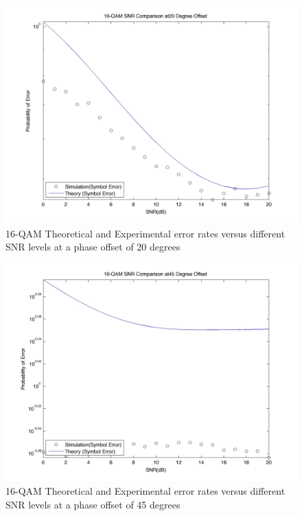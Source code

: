 \documentclass[]{article}
\begin{document}
\begin{figure}[H]
\centering
\hspace*{-2cm}\includegraphics[width=1.3\textwidth]{qam16SNRpo3.jpg}
\caption{16-QAM Theoretical and Experimental error rates versus different SNR levels at a phase offset of 20 degrees }
\end{figure}

\begin{figure}[H]
\centering
\hspace*{-2cm}\includegraphics[width=1.3\textwidth]{qam16SNRpo4.jpg}
\caption{16-QAM Theoretical and Experimental error rates versus different SNR levels at a phase offset of 45 degrees }
\end{figure}
\end{document}
